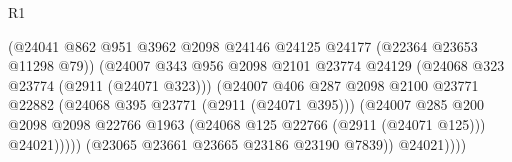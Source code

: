 \begin{lexlean}{R1}
\begin{coremodule}
                                                      (@24041
                                                        @862
                                                        @951
                                                        @3962
                                                        @2098
                                                        @24146
                                                        @24125
                                                        @24177
                                                        (@22364 @23653 @11298 @79))
                                                      (@24007
                                                        @343
                                                        @956
                                                        @2098
                                                        @2101
                                                        @23774
                                                        @24129
                                                        (@24068 @323 @23774 (@2911 (@24071 @323)))
                                                        (@24007
                                                          @406
                                                          @287
                                                          @2098
                                                          @2100
                                                          @23771
                                                          @22882
                                                          (@24068 @395 @23771 (@2911 (@24071 @395)))
                                                          (@24007
                                                            @285
                                                            @200
                                                            @2098
                                                            @2098
                                                            @22766
                                                            @1963
                                                            (@24068
                                                              @125
                                                              @22766
                                                              (@2911 (@24071 @125)))
                                                            @24021)))))
                                                  (@23065 @23661 @23665 @23186 @23190 @7839))
                                                @24021))))

\end{coremodule}
\end{lexlean}
